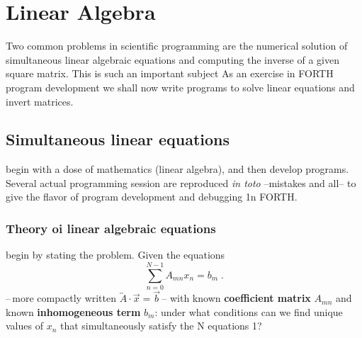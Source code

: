 
% 
% 
% 
% 

      
 
   
 
\chapter{Linear Algebra}

Two common problems in scientific programming are the
numerical solution of simultaneous linear algebraic equations
and computing the inverse of a given square matrix. This is such
an important subject As an exercise in FORTH program
development we shall now write programs to solve linear equations and invert matrices.

\section{Simultaneous linear equations}
 begin with a dose of mathematics (linear algebra), and 
then develop programs. Several actual programming session
are reproduced \textit{in toto} --mistakes and all-- to give the flavor of
program development and debugging 1n FORTH.
\subsection{Theory oi linear algebraic equations}
 begin by stating the problem. Given the equations
\begin{equation}
    \sum_{n=0}^{N-1}A_{mn}x_n=b_m \;. \label{eq:09_01}
\end{equation}
--\,more compactly written $\overleftrightarrow{A} \cdot \vec{x} = \vec{b}$\,-- with known \textbf{coefficient
matrix} $A_{mn}$ and known \textbf{inhomogeneous term} $b_m$: under what
conditions can we find unique values of $x_n$ that simultaneously
satisfy the N equations 1?

